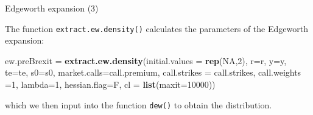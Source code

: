 \documentclass[ignorenonframetext,aspectratio=169]{beamer}
\newenvironment{Shaded}{}{}
\newcommand{\KeywordTok}[1]{\textcolor[rgb]{0.00,0.44,0.13}{\textbf{#1}}}
\newcommand{\DataTypeTok}[1]{\textcolor[rgb]{0.56,0.13,0.00}{#1}}
\newcommand{\DecValTok}[1]{\textcolor[rgb]{0.25,0.63,0.44}{#1}}
\newcommand{\StringTok}[1]{\textcolor[rgb]{0.25,0.44,0.63}{#1}}
\newcommand{\OtherTok}[1]{\textcolor[rgb]{0.00,0.44,0.13}{#1}}
\newcommand{\OperatorTok}[1]{\textcolor[rgb]{0.40,0.40,0.40}{#1}}
\newcommand{\NormalTok}[1]{#1}
\begin{document}
\begin{frame}[fragile]{Edgeworth expansion (3)}

The function \texttt{extract.ew.density()} calculates the parameters of
the Edgeworth expansion:

\begin{Shaded}
\begin{Highlighting}[]
\NormalTok{ew.preBrexit =}\StringTok{ }\KeywordTok{extract.ew.density}\NormalTok{(}\DataTypeTok{initial.values =} \KeywordTok{rep}\NormalTok{(}\OtherTok{NA}\NormalTok{,}\DecValTok{2}\NormalTok{), }
                       \DataTypeTok{r=}\NormalTok{r, }\DataTypeTok{y=}\NormalTok{y, }\DataTypeTok{te=}\NormalTok{te, }\DataTypeTok{s0=}\NormalTok{s0, }
                       \DataTypeTok{market.calls=}\NormalTok{call.premium, }
                       \DataTypeTok{call.strikes =}\NormalTok{ call.strikes, }
                       \DataTypeTok{call.weights =}\DecValTok{1}\NormalTok{, }\DataTypeTok{lambda=}\DecValTok{1}\NormalTok{, }\DataTypeTok{hessian.flag=}\NormalTok{F, }
                       \DataTypeTok{cl =} \KeywordTok{list}\NormalTok{(}\DataTypeTok{maxit=}\DecValTok{10000}\NormalTok{))}
\end{Highlighting}
\end{Shaded}

which we then input into the function \texttt{dew()} to obtain the
distribution.

\begin{Shaded}
\end{Shaded}

\end{frame}
\end{document}
